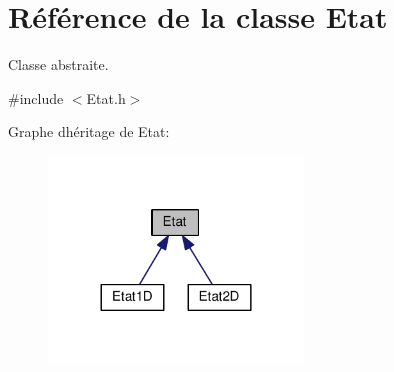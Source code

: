 \hypertarget{class_etat}{}\section{Référence de la classe Etat}
\label{class_etat}


Classe abstraite.  




{\ttfamily \#include $<$Etat.\+h$>$}



Graphe d\textquotesingle{}héritage de Etat\+:\nopagebreak
\begin{figure}[H]
\begin{center}
\leavevmode
\includegraphics[width=192pt]{class_etat__inherit__graph}
\end{center}
\end{figure}
